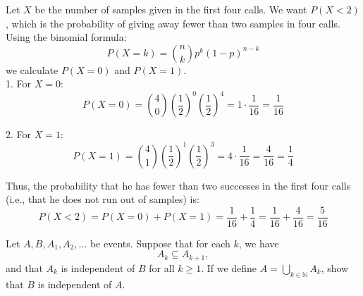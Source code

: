 \begin{solution}
Let \(X\) be the number of samples given in the first four calls. We want \(P(X < 2)\), which is the probability of giving away fewer than two samples in four calls.\\

Using the binomial formula:
\[
P(X = k) = \binom{n}{k} p^k (1 - p)^{n - k}
\]
we calculate \(P(X = 0)\) and \(P(X = 1)\).\\

1. For \(X = 0\):
   \[
   P(X = 0) = \binom{4}{0} \left(\frac{1}{2}\right)^0 \left(\frac{1}{2}\right)^4 = 1 \cdot \frac{1}{16} = \frac{1}{16}
   \]

2. For \(X = 1\):
   \[
   P(X = 1) = \binom{4}{1} \left(\frac{1}{2}\right)^1 \left(\frac{1}{2}\right)^3 = 4 \cdot \frac{1}{16} = \frac{4}{16} = \frac{1}{4}
   \]

Thus, the probability that he has fewer than two successes in the first four calls (i.e., that he does not run out of samples) is:
\[
P(X < 2) = P(X = 0) + P(X = 1) = \frac{1}{16} + \frac{1}{4} = \frac{1}{16} + \frac{4}{16} = \frac{5}{16}
\]
\end{solution}

\begin{exercise}
    Let \( A, B, A_1, A_2, \dots \) be events. Suppose that for each \( k \), we have 
    \[
    A_k \subseteq A_{k+1},
    \]
    and that \( A_k \) is independent of \( B \) for all \( k \geq 1 \). If we define \( A = \bigcup_{k \in \mathbb{N}} A_k \), show that \( B \) is independent of \( A \).    
\end{exercise}

